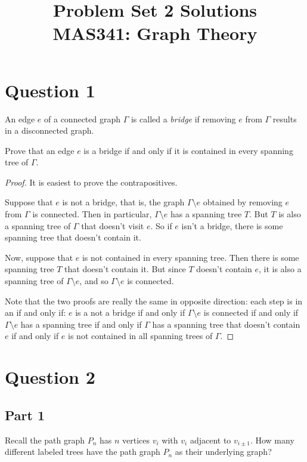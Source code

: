\documentclass{amsart}
\title{Problem Set 2 Solutions \\ MAS341: Graph Theory }
\begin{document}
\maketitle
\section{Question 1}
An edge $e$ of a connected graph $\Gamma$ is called a \emph{bridge} if removing $e$ from $\Gamma$ results in a disconnected graph.  

Prove that an edge $e$ is a bridge if and only if it is contained in every spanning tree of $\Gamma$.


\begin{proof}

It is easiest to prove the contrapositives.

Suppose that $e$ is not a bridge, that is, the graph $\Gamma\setminus e$ obtained by removing $e$ from $\Gamma$ is connected.  Then in particular, $\Gamma\setminus e$ has a spanning tree $T$.  But $T$ is also a spanning tree of $\Gamma$ that doesn't visit $e$.  So if $e$ isn't a bridge, there is some spanning tree that doesn't contain it.

Now, suppose that $e$ is not contained in every spanning tree.  Then there is some spanning tree $T$ that doesn't contain it.  But since $T$ doesn't contain $e$, it is also a spanning tree of $\Gamma\setminus e$, and so $\Gamma\setminus e$ is connected.


Note that the two proofs are really the same in opposite direction: each step is in an if and only if: $e$ is a not a bridge if and only if $\Gamma\setminus e$ is connected if and only if $\Gamma\setminus e$ has a spanning tree if and only if $\Gamma$ has a spanning tree that doesn't contain $e$ if and only if $e$ is not contained in all spanning trees of $\Gamma$.

\end{proof}

\section{Question 2}
\subsection{Part 1} Recall the path graph $P_n$ has $n$ vertices $v_i$ with $v_i$ adjacent to $v_{i\pm 1}$.  How many different labeled trees have the path graph $P_n$ as their underlying graph?
\end{document}
